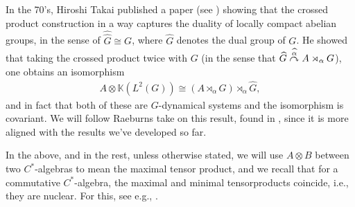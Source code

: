 In the 70's, Hiroshi Takai published a paper (see \cite{takai1975duality}) showing that the crossed product construction in a way captures the duality of locally compact abelian groups, in the sense of $\hat{\hat G} \cong G$, where $\hat G$ denotes the dual group of $G$. He showed that taking the crossed product twice with $G$ (in the sense that $\widehat{G} \stackrel{\widehat{\alpha}}{\curvearrowright} A \rtimes_\alpha G$), one obtains an isomorphism 
\begin{align*}
A \otimes \mathbb{K}(L^2(G)) \cong (A \rtimes_\alpha G) \rtimes_{\hat \alpha} \hat G,
\end{align*}
and in fact that both of these are $G$-dynamical systems and the isomorphism is covariant.  We will follow Raeburns take on this result, found in \cite{raeburn1988crossed}, since it is more aligned with the results we've developed so far.
\begin{note}
In the above, and in the rest, unless otherwise stated, we will use $A \otimes B$ between two $C^*$-algebras to mean the maximal tensor product, and we recall that for a commutative $C^*$-algebra, the maximal and minimal tensorproducts coincide, i.e., they are nuclear. For this, see e.g., \cite{brown2008c}.
\end{note}

